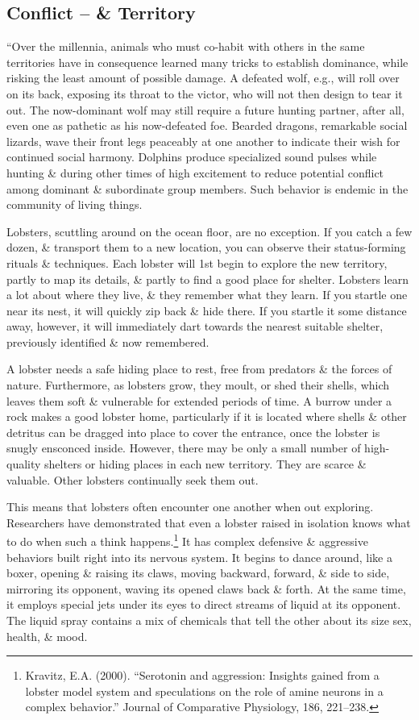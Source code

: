 \documentclass[oneside]{book}
\numberwithin{equation}{section}
\begin{document}
\subsection{Conflict -- \& Territory}
``Over the millennia, animals who must co-habit with others in the same territories have in consequence learned many tricks to establish dominance, while risking the least amount of possible damage. A defeated wolf, e.g., will roll over on its back, exposing its throat to the victor, who will not then design to tear it out. The now-dominant wolf may still require a future hunting partner, after all, even one as pathetic as his now-defeated foe. Bearded dragons, remarkable social lizards, wave their front legs peaceably at one another to indicate their wish for continued social harmony. Dolphins produce specialized sound pulses while hunting \& during other times of high excitement to reduce potential conflict among dominant \& subordinate group members. Such behavior is endemic in the community of living things.

Lobsters, scuttling around on the ocean floor, are no exception. If you catch a few dozen, \& transport them to a new location, you can observe their status-forming rituals \& techniques. Each lobster will 1st begin to explore the new territory, partly to map its details, \& partly to find a good place for shelter. Lobsters learn a lot about where they live, \& they remember what they learn. If you startle one near its nest, it will quickly zip back \& hide there. If you startle it some distance away, however, it will immediately dart towards the nearest suitable shelter, previously identified \& now remembered.

A lobster needs a safe hiding place to rest, free from predators \& the forces of nature. Furthermore, as lobsters grow, they moult, or shed their shells, which leaves them soft \& vulnerable for extended periods of time. A burrow under a rock makes a good lobster home, particularly if it is located where shells \& other detritus can be dragged into place to cover the entrance, once the lobster is snugly ensconced inside. However, there may be only a small number of high-quality shelters or hiding places in each new territory. They are scarce \& valuable. Other lobsters continually seek them out.

This means that lobsters often encounter one another when out exploring. Researchers have demonstrated that even a lobster raised in isolation knows what to do when such a think happens.\footnote{Kravitz, E.A. (2000). ``Serotonin and aggression: Insights gained from a lobster model system and speculations on the role of amine neurons in a complex behavior.'' Journal of Comparative Physiology, 186, 221--238.} It has complex defensive \& aggressive behaviors built right into its nervous system. It begins to dance around, like a boxer, opening \& raising its claws, moving backward, forward, \& side to side, mirroring its opponent, waving its opened claws back \& forth. At the same time, it employs special jets under its eyes to direct streams of liquid at its opponent. The liquid spray contains a mix of chemicals that tell the other about its size sex, health, \& mood.
\end{document}
